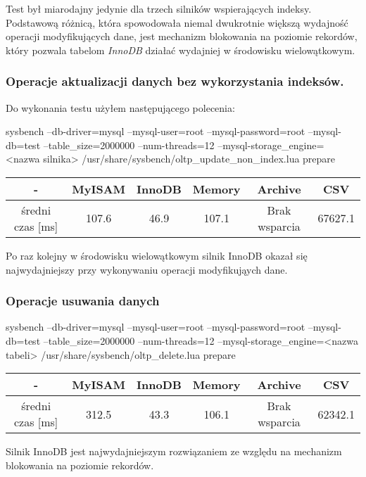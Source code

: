 Test był miarodajny jedynie dla trzech silników wspierających indeksy. Podstawową różnicą, która spowodowała niemal dwukrotnie większą wydajność operacji modyfikujących dane, jest mechanizm blokowania na poziomie rekordów, który pozwala tabelom \textit{InnoDB} działać wydajniej w środowisku wielowątkowym.

\subsubsection{Operacje aktualizacji danych bez wykorzystania indeksów.}
Do wykonania testu użyłem następującego polecenia:
\begin{spverbatim}
	sysbench --db-driver=mysql --mysql-user=root --mysql-password=root --mysql-db=test --table_size=2000000 --num-threads=12 --mysql-storage_engine=
	<nazwa silnika> /usr/share/sysbench/oltp_update_non_index.lua prepare
	
\end{spverbatim}
\begin{center}
	\begin{tabular}{ | c | c | c | c | c | c |}
		\hline
		- & MyISAM & InnoDB & Memory & Archive & CSV  \\ 
		\hline
		średni czas [ms] & 107.6 & 46.9 & 107.1 & Brak wsparcia & 67627.1 \\
		\hline
	\end{tabular}
\end{center}

Po raz kolejny w środowisku wielowątkowym silnik InnoDB okazał się najwydajniejszy przy wykonywaniu operacji modyfikująych dane. 
\subsubsection{Operacje usuwania danych}

\begin{spverbatim}
	sysbench --db-driver=mysql --mysql-user=root --mysql-password=root --mysql-db=test --table_size=2000000 --num-threads=12 --mysql-storage_engine=<nazwa tabeli>  /usr/share/sysbench/oltp_delete.lua prepare
\end{spverbatim}

\begin{center}
\begin{tabular}{ | c | c | c | c | c | c |}
	\hline
	- & MyISAM & InnoDB & Memory & Archive & CSV  \\ 
	\hline
	średni czas [ms] & 312.5 & 43.3 & 106.1 & Brak wsparcia & 62342.1 \\
	\hline
\end{tabular}

Silnik InnoDB jest najwydajniejszym rozwiązaniem ze względu na mechanizm blokowania na poziomie rekordów.
\end{center}


